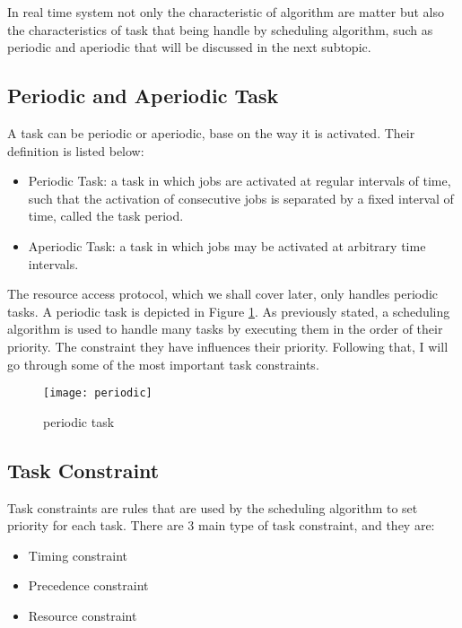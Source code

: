 In real time system not only the characteristic of algorithm are matter but also the characteristics  of task that being handle by scheduling algorithm, such as periodic and aperiodic that will be discussed in the next subtopic.

\subsection{Periodic and Aperiodic Task}

A task can be periodic or aperiodic, base on the way it is activated. Their definition is listed below:
\begin{itemize}
\item Periodic Task: a task in which jobs are activated at regular intervals of time, such that the activation of consecutive jobs is separated by a fixed interval of time, called the task period\cite{b4}.
\item Aperiodic Task: a task in which jobs may be activated at arbitrary time intervals\cite{b4}.
\end{itemize}

The resource access protocol, which we shall cover later, only handles periodic tasks. A periodic task is depicted in Figure \ref{fig:periodic}. As previously stated, a scheduling algorithm is used to handle many tasks by executing them in the order of their priority. The constraint they have influences their priority. Following that, I will go through some of the most important task constraints.

\begin{figure}[ht]
    \centering
    \texttt{[image: periodic]}
    \caption{periodic task \cite{b5}}
    \label{fig:periodic}
\end{figure}

\subsection{Task Constraint}

Task constraints are rules that are used by the scheduling algorithm to set  priority for each task. There are 3 main type of task constraint, and they are:

\begin{itemize}
\item Timing constraint
\item Precedence constraint
\item Resource constraint
\end{itemize}

